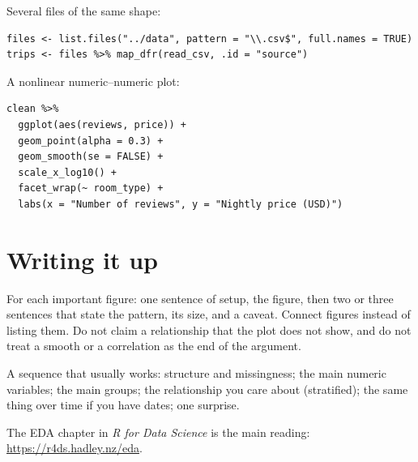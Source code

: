 \documentclass[11pt, a4paper]{article}
\begin{document}
Several files of the same shape:

\begin{lstlisting}
files <- list.files("../data", pattern = "\\.csv$", full.names = TRUE)
trips <- files %>% map_dfr(read_csv, .id = "source")
\end{lstlisting}

A nonlinear numeric--numeric plot:

\begin{lstlisting}
clean %>%
  ggplot(aes(reviews, price)) +
  geom_point(alpha = 0.3) +
  geom_smooth(se = FALSE) +
  scale_x_log10() +
  facet_wrap(~ room_type) +
  labs(x = "Number of reviews", y = "Nightly price (USD)")
\end{lstlisting}

\section*{Writing it up}

For each important figure: one sentence of setup, the figure, then two or three sentences that state the pattern, its size, and a caveat. Connect figures instead of listing them. Do not claim a relationship that the plot does not show, and do not treat a smooth or a correlation as the end of the argument.

A sequence that usually works: structure and missingness; the main numeric variables; the main groups; the relationship you care about (stratified); the same thing over time if you have dates; one surprise.

The EDA chapter in \emph{R for Data Science} is the main reading: \url{https://r4ds.hadley.nz/eda}.
\end{document}
